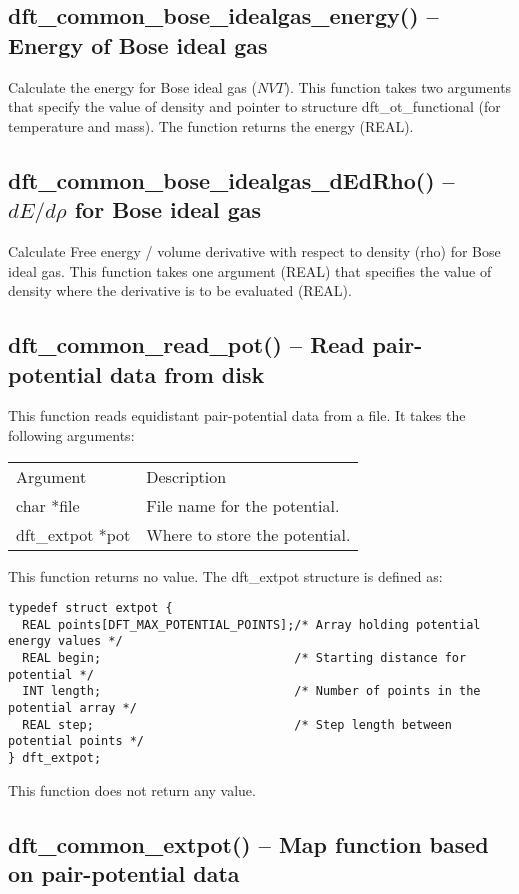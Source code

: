 \documentclass[12pt,letterpaper]{report}
\begin{document}
\subsection{dft\_common\_bose\_idealgas\_energy() -- Energy of Bose ideal gas}

Calculate the energy for Bose ideal gas ($NVT$). This function takes two arguments that specify the value of density and pointer to structure dft\_ot\_functional (for temperature and mass). The function returns the energy (REAL).

\subsection{dft\_common\_bose\_idealgas\_dEdRho() -- $dE/d\rho$ for Bose ideal gas}

Calculate Free energy / volume derivative with respect to density (rho) for Bose ideal gas. This function takes one argument (REAL) that specifies the value of density where the derivative is to be evaluated (REAL).

\subsection{dft\_common\_read\_pot() -- Read pair-potential data from disk}

This function reads equidistant pair-potential data from a file. It takes the following arguments:
\begin{longtable}{p{} p{}}
Argument & Description\\
\cline{1-2}
char *file & File name for the potential.\\
dft\_extpot *pot & Where to store the potential.\\
\end{longtable}
\noindent
This function returns no value. The dft\_extpot structure is defined as:
\begin{verbatim}
typedef struct extpot {
  REAL points[DFT_MAX_POTENTIAL_POINTS];/* Array holding potential energy values */
  REAL begin;                           /* Starting distance for potential */
  INT length;                           /* Number of points in the potential array */
  REAL step;                            /* Step length between potential points */
} dft_extpot;
\end{verbatim}
This function does not return any value.

\subsection{dft\_common\_extpot() -- Map function based on pair-potential data}
\end{document}
